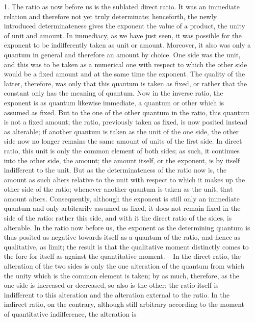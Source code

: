 1. The ratio as now before us is the sublated direct ratio. It was an immediate
relation and therefore not yet truly determinate; henceforth, the newly
introduced determinateness gives the exponent the value of a product, the
unity of unit and amount. In immediacy, as we have just seen, it was
possible for the exponent to be indifferently taken as unit or amount.
Moreover, it also was only a quantum in general and therefore an amount
by choice. One side was the unit, and this was to be taken as a numerical
one with respect to which the other side would be a fixed amount and at
the same time the exponent. The quality of the latter, therefore, was only
that this quantum is taken as fixed, or rather that the constant only has the
meaning of quantum.
Now in the inverse ratio, the exponent is as quantum likewise immediate,
a quantum or other which is assumed as fixed. But to the one of the
other quantum in the ratio, this quantum is not a fixed amount; the ratio,
previously taken as fixed, is now posited instead as alterable; if another
quantum is taken as the unit of the one side, the other side now no longer
remains the same amount of units of the first side. In direct ratio, this unit
is only the common element of both sides; as such, it continues into the
other side, the amount; the amount itself, or the exponent, is by itself
indifferent to the unit.
But as the determinateness of the ratio now is, the amount as such alters
relative to the unit with respect to which it makes up the other side of the
ratio; whenever another quantum is taken as the unit, that amount alters.
Consequently, although the exponent is still only an immediate quantum
and only arbitrarily assumed as fixed, it does not remain fixed in the side of
the ratio: rather this side, and with it the direct ratio of the sides, is alterable.
In the ratio now before us, the exponent as the determining quantum is
thus posited as negative towards itself as a quantum of the ratio, and hence
as qualitative, as limit; the result is that the qualitative moment distinctly
comes to the fore for itself as against the quantitative moment. – In the
direct ratio, the alteration of the two sides is only the one alteration of the
quantum from which the unity which is the common element is taken; by as
much, therefore, as the one side is increased or decreased, so also is the other;
the ratio itself is indifferent to this alteration and the alteration external
to the ratio. In the indirect ratio, on the contrary, although still arbitrary
according to the moment of quantitative indifference, the alteration is
